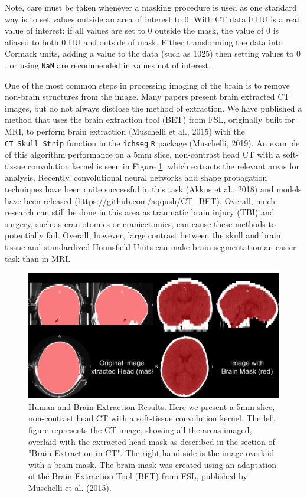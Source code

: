 \documentclass[utf8]{frontiersSCNS}
\begin{document}
Note, care must be taken whenever a masking procedure is used as one standard way is to set values outside an area of interest to \(0\). With CT data \(0\) HU is a real value of interest: if all values are set to \(0\) outside the mask, the value of \(0\) is aliased to both \(0\) HU and outside of mask. Either transforming the data into Cormack units, adding a value to the data (such as \(1025\)) then setting values to \(0\), or using \texttt{NaN} are recommended in values not of interest.

One of the most common steps in processing imaging of the brain is to remove non-brain structures from the image. Many papers present brain extracted CT images, but do not always disclose the method of extraction. We have published a method that uses the brain extraction tool (BET) from FSL, originally built for MRI, to perform brain extraction (Muschelli et al., 2015) with the \texttt{CT\_Skull\_Strip} function in the \texttt{ichseg} \texttt{R} package (Muschelli, 2019). An example of this algorithm performance on a 5mm slice, non-contrast head CT with a soft-tissue convolution kernel is seen in Figure \ref{fig:ss}, which extracts the relevant areas for analysis. Recently, convolutional neural networks and shape propagation techniques have been quite successful in this task (Akkus et al., 2018) and models have been released (\url{https://github.com/aqqush/CT_BET}). Overall, much research can still be done in this area as traumatic brain injury (TBI) and surgery, such as craniotomies or craniectomies, can cause these methods to potentially fail. Overall, however, large contrast between the skull and brain tissue and standardized Hounsfield Units can make brain segmentation an easier task than in MRI.

\begin{figure}
\includegraphics[width=1\linewidth]{frontiers_files/figure-latex/ss-1} \caption{Human and Brain Extraction Results.  Here we present a 5mm slice, non-contrast head CT with a soft-tissue convolution kernel.  The left figure represents the CT image, showing all the areas imaged, overlaid with the extracted head mask as described in the section of "Brain Extraction in CT".  The right hand side is the image overlaid with a brain mask.  The brain mask was created using an adaptation of the Brain Extraction Tool (BET) from FSL, published by Muschelli et al. (2015).}\label{fig:ss}
\end{figure}
\end{document}
